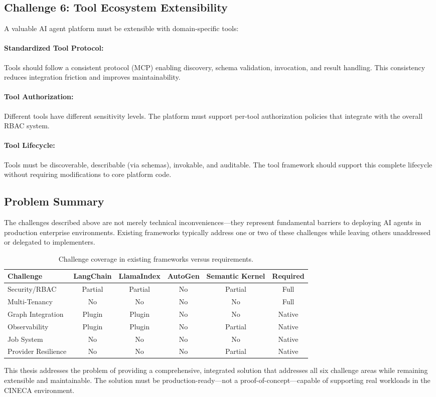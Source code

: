 \subsection{Challenge 6: Tool Ecosystem Extensibility}

A valuable AI agent platform must be extensible with domain-specific tools:

\paragraph{Standardized Tool Protocol:}
Tools should follow a consistent protocol (MCP) enabling discovery, schema validation, invocation, and result handling. This consistency reduces integration friction and improves maintainability.

\paragraph{Tool Authorization:}
Different tools have different sensitivity levels. The platform must support per-tool authorization policies that integrate with the overall RBAC system.

\paragraph{Tool Lifecycle:}
Tools must be discoverable, describable (via schemas), invokable, and auditable. The tool framework should support this complete lifecycle without requiring modifications to core platform code.

\subsection{Problem Summary}

The challenges described above are not merely technical inconveniences---they represent fundamental barriers to deploying AI agents in production enterprise environments. Existing frameworks typically address one or two of these challenges while leaving others unaddressed or delegated to implementers.

\begin{table}[ht]
\centering
\caption{Challenge coverage in existing frameworks versus requirements.}
\label{tab:challenge-coverage}
\small
\begin{tabular}{lccccc}
\hline
\textbf{Challenge} & \textbf{LangChain} & \textbf{LlamaIndex} & \textbf{AutoGen} & \textbf{Semantic Kernel} & \textbf{Required} \\
\hline
Security/RBAC & Partial & Partial & No & Partial & Full \\
Multi-Tenancy & No & No & No & No & Full \\
Graph Integration & Plugin & Plugin & No & No & Native \\
Observability & Plugin & Plugin & No & Partial & Native \\
Job System & No & No & No & No & Native \\
Provider Resilience & No & No & No & Partial & Native \\
\hline
\end{tabular}
\end{table}

This thesis addresses the problem of providing a comprehensive, integrated solution that addresses all six challenge areas while remaining extensible and maintainable. The solution must be production-ready---not a proof-of-concept---capable of supporting real workloads in the CINECA environment.

